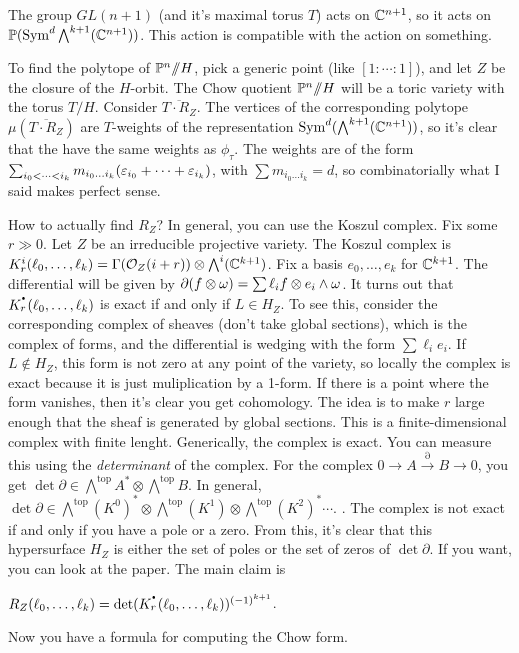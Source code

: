 The group $GL(n+1)$ (and it's maximal torus $T$) acts on $\mathbb{C}^{n+1}$, so it acts on $\mathbb{P}(\operatorname{Sym}^d \bigwedge^{k+1}(\mathbb{C}^{n+1}))$. This action is compatible with the action on something.

To find the polytope of $\mathbb{P}^n\mbox{\rm /\!\!/} H$, pick a generic point (like $[1:\cdots :1]$), and let $Z$ be the closure of the $H$-orbit. The Chow quotient $\mathbb{P}^n\mbox{\rm /\!\!/} H$ will be a toric variety with the torus $T/H$. Consider $\overline{T\cdot R_Z}$. The vertices of the corresponding polytope $\mu(\overline{T\cdot R_Z})$ are $T$-weights of the representation $\operatorname{Sym}^d(\bigwedge^{k+1}(\mathbb{C}^{n+1}))$, so it's clear that the have the same weights as $\phi_\tau$. The weights are of the form $\sum_{i_0<\cdots <i_k}m_{i_0\dots i_k}(\varepsilon_{i_0}+\cdots +\varepsilon_{i_k})$, with $\sum m_{i_0\dots i_k}=d$, so combinatorially what I said makes perfect sense.

How to actually find $R_Z$? In general, you can use the Koszul complex. Fix some $r\gg 0$. Let $Z$ be an irreducible projective variety. The Koszul complex is $K_r^i(\ell_0,\dots, \ell_k)=\Gamma(\mathcal{O}_Z(i+r))\otimes \bigwedge^i(\mathbb{C}^{k+1})$. Fix a basis $e_0,\dots, e_k$ for $\mathbb{C}^{k+1}$. The differential will be given by $\partial (f\otimes \omega) = \sum \ell_if\otimes e_i\wedge \omega$. It turns out that $K^\udot_r(\ell_0,\dots, \ell_k)$ is exact if and only if $L\in H_Z$. To see this, consider the corresponding complex of sheaves (don't take global sections), which is the complex of forms, and the differential is wedging with the form $\sum \ell_i e_i$. If $L\not\in H_Z$, this form is not zero at any point of the variety, so locally the complex is exact because it is just muliplication by a 1-form. If there is a point where the form vanishes, then it's clear you get cohomology. The idea is to make $r$ large enough that the sheaf is generated by global sections. This is a finite-dimensional complex with finite lenght. Generically, the complex is exact. You can measure this using the \emph{determinant} of the complex. For the complex $0\to A\xrightarrow\partial B\to 0$, you get $\det\partial \in \bigwedge^{\text{top}} A^*\otimes \bigwedge^{\text{top}}B$. In general, $\det \partial \in \bigwedge^{\text{top}} (K^0)^* \otimes \bigwedge^{\text{top}} (K^1)\otimes \bigwedge^{\text{top}} (K^2)^* \cdots $. . The complex is not exact if and only if you have a pole or a zero. From this, it's clear that this hypersurface $H_Z$ is either the set of poles or the set of zeros of $\det \partial$. If you want, you can look at the paper. The main claim is
\begin{claim}
 $R_Z(\ell_0,\dots, \ell_k)=\det(K^\udot_r(\ell_0,\dots, \ell_k))^{(-1)^{k+1}}$.
\end{claim}
Now you have a formula for computing the Chow form.

